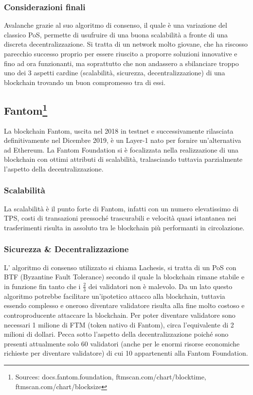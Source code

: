 \documentclass[a4paper, 12pt]{article}
\begin{document}
\subsubsection*{Considerazioni finali}
Avalanche grazie al suo algoritmo di consenso, il quale è una variazione del classico PoS, permette di usufruire di una buona scalabilità a fronte di una discreta decentralizzazione. Si tratta di un network molto giovane, che ha riscosso parecchio successo proprio per essere riuscito a proporre soluzioni innovative e fino ad ora funzionanti, ma soprattutto che non andassero a sbilanciare troppo uno dei 3 aspetti cardine (scalabilità, sicurezza, decentralizzazione) di una blockchain trovando un buon compromesso tra di essi.
\newpage
\subsection*{Fantom\footnote{Sources: docs.fantom.foundation, ftmscan.com/chart/blocktime, ftmscan.com/chart/blocksize}}
La blockchain Fantom, uscita nel 2018 in testnet e successivamente rilasciata definitivamente nel Dicembre 2019, è un Layer-1 nato per fornire un'alternativa ad Ethereum.
La Fantom Foundation si è focalizzata nella realizzazione di una blockchain con ottimi attributi di scalabilità, tralasciando tuttavia parzialmente l'aspetto della decentralizzazione.
\subsubsection*{Scalabilità}
La scalabilità è il punto forte di Fantom, infatti con un numero elevatissimo di TPS, costi di transazioni pressoché trascurabili e velocità quasi istantanea nei trasferimenti risulta in assoluto tra le blockchain più performanti in circolazione.
\subsubsection*{Sicurezza \& Decentralizzazione}
L' algoritmo di consenso utilizzato si chiama Lachesis, si tratta di un PoS con BTF (Byzantine Fault Tolerance) secondo il quale la blockchain rimane stabile e in funzione fin tanto che i $\frac{2}{3}$ dei validatori non è malevolo.
Da un lato questo algoritmo potrebbe facilitare un'ipotetico attacco alla blockchain, tuttavia essendo complesso e oneroso diventare validatore risulta alla fine molto costoso e controproducente attaccare la blockchain.
Per poter diventare validatore sono necessari 1 milione di FTM (token nativo di Fantom), circa l’equivalente di 2 milioni di dollari.
Pecca sotto l’aspetto della decentralizzazione poiché sono presenti attualmente solo 60 validatori (anche per le enormi risorse economiche richieste per diventare validatore) di cui 10 appartenenti alla Fantom Foundation.
\end{document}

